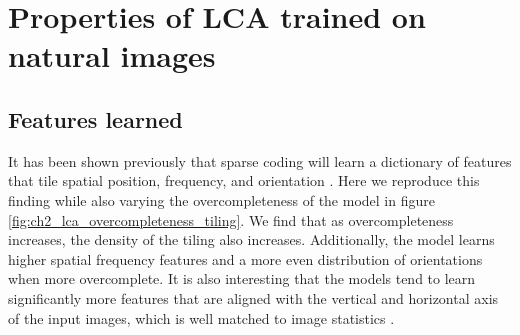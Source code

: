 \section{Properties of LCA trained on natural images}\label{sec:ch2_lca_properties}
\subsection{Features learned}
It has been shown previously that sparse coding will learn a dictionary of features that tile spatial position, frequency, and orientation \cite{olshausen1996emergence, olshausen1997sparse}. Here we reproduce this finding while also varying the overcompleteness of the model in figure \ref{fig:ch2_lca_overcompleteness_tiling}. We find that as overcompleteness increases, the density of the tiling also increases. Additionally, the model learns higher spatial frequency features and a more even distribution of orientations when more overcomplete. It is also interesting that the models tend to learn significantly more features that are aligned with the vertical and horizontal axis of the input images, which is well matched to image statistics \parencite{switkes1978spatial, torralba2003statistics}.

